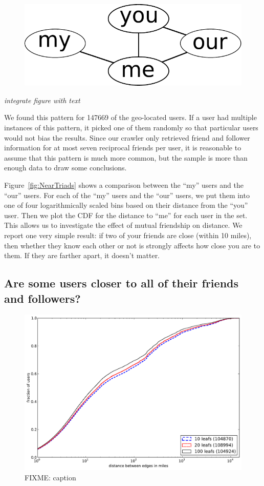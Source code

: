 \begin{figure}[h!]
\centering
\includegraphics[width=0.4\linewidth]{figures/near_triads_dia.pdf}
\label{fig:NearTriadsDia}
\end{figure}

\emph{integrate figure with text}

We found this pattern for 147669 of the geo-located users.
If a user had multiple instances of this pattern, it picked one of them
randomly so that particular users would not bias the results.
Since our crawler only retrieved friend and follower information for at most
seven reciprocal friends per user, it is reasonable to assume that this pattern
is much more common, but the sample is more than enough data to draw some
conclusions.

Figure~\ref{fig:NearTriads} shows a comparison between the ``my'' users and the
``our'' users.
For each of the ``my'' users and the ``our'' users, we put them into one of
four logarithmically scaled bins based on their distance from the ``you'' user.
Then we plot the CDF for the distance to ``me'' for each user in the set. This
allows us to investigate the effect of mutual friendship on distance.
We report one very simple result: if two of your friends are close (within 10
miles), then whether they know each other or not is strongly affects how close
you are to them. If they are farther apart, it doesn't matter.

\subsection{Are some users closer to all of their friends and followers?}

\begin{figure}[tb]
\centering
\includegraphics[width=\linewidth]{figures/locals_cmp.pdf}
\caption{
    FIXME: caption
}
\label{fig:LocalCmp}
\end{figure}

